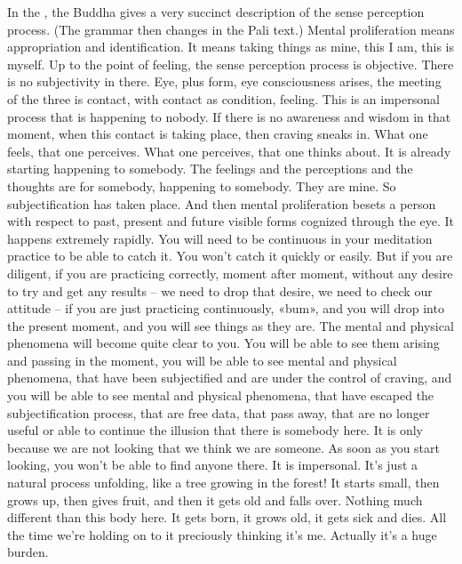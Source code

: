 \documentclass[letterpaper,10pt,english]{sphinxmanual}
\begin{document}
\sphinxAtStartPar
In the
, the Buddha gives a very succinct description of the sense perception process.
(The grammar then changes in the Pali text.)
Mental proliferation means
appropriation and identification. It means taking things as mine, this I am,
this  is  myself.  Up  to  the  point  of  feeling,  the  sense  perception  process  is
objective. There is no subjectivity in there. Eye, plus form, eye consciousness  arises,  the  meeting  of  the  three  is  contact,  with  contact  as  condition,
feeling. This is an impersonal process that is happening to nobody. If there is
no awareness and wisdom in that moment, when this contact is taking place,
then craving sneaks in. What one feels, that one perceives. What one perceives, that one thinks about. It is already starting happening to somebody.
The feelings and the perceptions and the thoughts are for somebody, happening to somebody. They are mine. So subjectification has taken place. And
then mental proliferation besets a person with respect to past, present and
future visible forms cognized through the eye. It happens extremely rapidly.
You will need to be continuous in your meditation practice to be able
to catch it. You won’t catch it quickly or easily. But if you are diligent, if
you  are  practicing  correctly,  moment  after  moment,  without  any  desire  to
try and get any results – we need to drop that desire, we need to check our
attitude – if you are just practicing continuously, «bum», and you will drop
into the present moment, and you will see things as they are. The mental and
  physical phenomena will become quite clear to you. You will be able to see
them arising and passing in the moment, you will be able to see mental and
physical phenomena, that have been subjectified and are under the control
of craving, and you will be able to see mental and physical phenomena, that
have escaped the subjectification process, that are free data, that pass away,
that are no longer useful or able to continue the illusion that there is somebody here. It is only because we are not looking that we think we are someone. As soon as you start looking, you won’t be able to find anyone there. It
is impersonal. It’s just a natural process unfolding, like a tree growing in the
forest! It starts small, then grows up, then gives fruit, and then it gets old and
falls over. Nothing much different than this body here. It gets born, it grows
old, it gets sick and dies. All the time we’re holding on to it preciously thinking it’s me. Actually it’s a huge burden.
\end{document}
